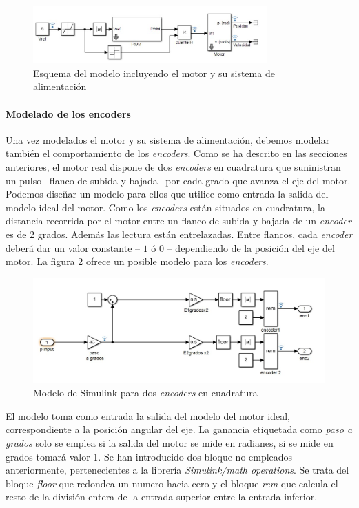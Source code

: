 \documentclass[10pt,a4paper]{report}
\begin{document}
\begin{figure}
\centering
\includegraphics[width=0.8\textwidth]{pwm_motor.jpg}
\caption{Esquema del modelo incluyendo el motor y su sistema de alimentación}
\label{f27}
\end{figure}  

\paragraph{Modelado de los encoders} Una vez modelados el motor y su sistema de alimentación, debemos modelar también el comportamiento de los \emph{encoders}. Como se ha descrito en las secciones anteriores, el motor real dispone de dos \emph{encoders} en cuadratura que suninistran un pulso --flanco de subida y bajada-- por cada grado que avanza el eje del motor. Podemos diseñar un modelo para ellos que utilice como entrada la salida del modelo ideal del motor. Como los \emph{encoders} están situados en cuadratura, la distancia recorrida por el motor entre un flanco de subida y bajada de un \emph{encoder} es de 2 grados. Además las lectura están entrelazadas. Entre flancos, cada \emph{encoder} deberá dar un valor constante -- $1$ ó $0$ -- dependiendo de la posición del eje del motor. La figura \ref{f28} ofrece un posible modelo para los \emph{encoders}.
\begin{figure}[h]
\centering
\includegraphics[width=\textwidth]{m_encoder.jpg}
\caption{Modelo de Simulink para dos \emph{encoders} en cuadratura}
\label{f28}
\end{figure}

El modelo toma como entrada la salida del modelo del motor ideal, correspondiente a la posición angular del eje. La ganancia etiquetada como \emph{paso a grados} solo se emplea si la salida del motor se mide en radianes, si se mide en grados tomará valor 1. Se han introducido dos bloque no empleados anteriormente, pertenecientes a la librería \emph{Simulink/math operations}. Se trata del bloque \emph{floor} que redondea un numero hacia cero y el bloque \emph{rem} que calcula el resto de la división entera de la entrada superior entre la entrada inferior.
\end{document}

